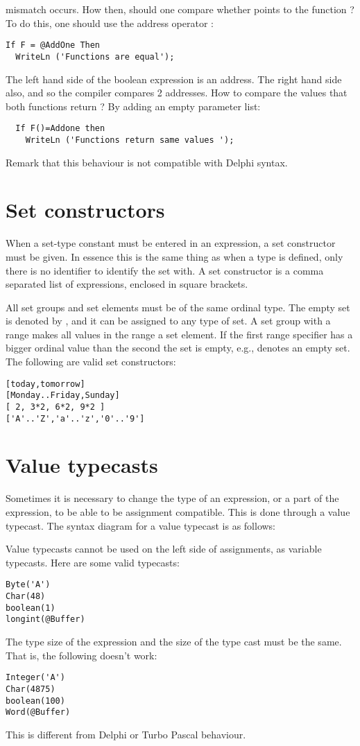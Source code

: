 mismatch occurs.
How then, should one compare whether  points to the function
 ? To do this, one should use the address operator :
\begin{verbatim}
If F = @AddOne Then
  WriteLn ('Functions are equal');
\end{verbatim}
The left hand side of the boolean expression is an address. The right hand
side also, and so the compiler compares 2 addresses.
How to compare the values that both functions return ? By adding an empty
parameter list:
\begin{verbatim}
  If F()=Addone then
    WriteLn ('Functions return same values ');
\end{verbatim}
Remark that this behaviour is not compatible with Delphi syntax.

\section{Set constructors}
When a set-type constant must be entered in an expression, a
set constructor must be given. In essence this is the same thing as when a
type is defined, only there is no identifier to identify the set with.
A set constructor is a comma separated list of expressions, enclosed in
square brackets.

All set groups and set elements must be of the same ordinal type.
The empty set is denoted by \var{[]}, and it can be assigned to any type of
set. A set group with a range  \var{[A..Z]} makes all values in the range a
set element. If the first range specifier has a bigger ordinal value than
the second the set is empty, e.g., \var{[Z..A]} denotes an empty set.
The following are valid set constructors:
\begin{verbatim}
[today,tomorrow]
[Monday..Friday,Sunday]
[ 2, 3*2, 6*2, 9*2 ]
['A'..'Z','a'..'z','0'..'9']
\end{verbatim}

\section{Value typecasts}
Sometimes it is necessary to change the type of an expression, or a part of
the expression, to be able to be assignment compatible. This is done through
a value typecast. The syntax diagram for a value typecast is as follows:

Value typecasts cannot be used on the left side of assignments, as variable
typecasts.
Here are some valid typecasts:
\begin{verbatim}
Byte('A')
Char(48)
boolean(1)
longint(@Buffer)
\end{verbatim}
The type size of the expression and the size of the type cast must be the
same. That is, the following doesn't work:
\begin{verbatim}
Integer('A')
Char(4875)
boolean(100)
Word(@Buffer)
\end{verbatim}
This is different from Delphi or Turbo Pascal behaviour.


